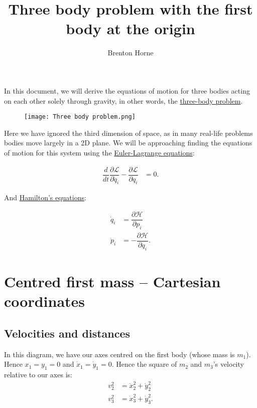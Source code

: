 \documentclass[12pt,a4paper,portrait]{article}
\date{}
\title{Three body problem with the first body at the origin}
\author{Brenton Horne}
\begin{document}
	\maketitle
	
	In this document, we will derive the equations of motion for three bodies acting on each other solely through gravity, in other words, the \href{https://en.wikipedia.org/wiki/Three-body_problem}{three-body problem}. 
	\begin{figure}[H]
		\texttt{[image: Three body problem.png]}
	\end{figure}
	
	Here we have ignored the third dimension of space, as in many real-life problems bodies move largely in a 2D plane. We will be approaching finding the equations of motion for this system using the \href{https://en.wikipedia.org/wiki/Euler-Lagrange_equations}{Euler-Lagrange equations}:
	
	\begin{align}
		\dfrac{d}{dt}\dfrac{\partial \mathcal{L}}{\partial \dot{q}_i} - \dfrac{\partial \mathcal{L}}{\partial q_i} &= 0.\label{ELE}
	\end{align}
	
	And \href{https://en.wikipedia.org/wiki/Hamilton's_equations}{Hamilton's equations}:
	
	\begin{align}
		\dot{q}_i &= \dfrac{\partial \mathcal{H}}{\partial p_i} \\
		\dot{p}_i &= -\dfrac{\partial \mathcal{H}}{\partial q_i}.
	\end{align}
	
	\tableofcontents
	
	\section{Centred first mass -- Cartesian coordinates}
	\subsection{Velocities and distances}
	In this diagram, we have our axes centred on the first body (whose mass is $m_1$). Hence $x_1=y_1 = 0$ and $\dot{x}_1 = \dot{y}_1 = 0$. Hence the square of $m_2$ and $m_3$'s velocity relative to our axes is: 
	\begin{align*}
		v_2^2 &= \dot{x}_2^2 + \dot{y}_2^2 \\
		v_3^2 &= \dot{x}_3^2 + \dot{y}_3^2.
	\end{align*}
	
\end{document}
